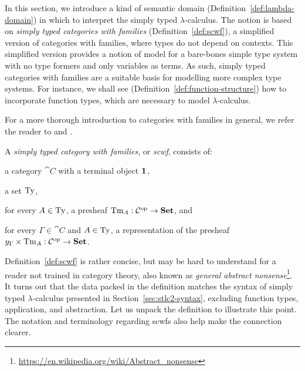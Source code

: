 In this section, we introduce a kind of semantic domain (Definition~\ref{def:lambda-domain}) in which to interpret the simply typed $\lambda$-calculus. The notion is based on \textit{simply typed categories with families} (Definition~\ref{def:scwf}), a simplified version of categories with families, where types do not depend on contexts. This simplified version provides a notion of model for a bare-bones simple type system with no type formers and only variables as terms. As such, simply typed categories with families are a suitable basis for modelling more complex type systems. For instance, we shall see (Definition~\ref{def:function-structure}) how to incorporate function types, which are necessary to model $\lambda$-calculus.

For a more thorough introduction to categories with families in general, we refer the reader to \cite{dybjer:1996:types} and \cite{castellan:2021:cwf}.

\begin{defn}[Scwf] \label{def:scwf}
A \emph{simply typed category with families}, or \emph{scwf}, consists of:
\begin{enum}
    \item a category $\cat{C}$ with a terminal object $\mathbf{1}_{}$,
    \item a set $\STy$,
    \item for every $A \in \STy$, a presheaf $\STm{A} : \op{\cat{C}} \to \Set$, and
    \item for every $\Gamma \in \cat{C}$ and $A \in \STy$, a representation of the presheaf $\cprod{\yap{\Gamma}}{\STm{A}} : \op{\cat{C}} \to \Set$.
\end{enum}
\end{defn}

Definition~\ref{def:scwf} is rather concise, but may be hard to understand for a reader not trained in category theory, also known as \textit{general abstract nonsense}\footnote{\url{https://en.wikipedia.org/wiki/Abstract_nonsense}}. It turns out that the data packed in the definition matches the syntax of simply typed $\lambda$-calculus presented in Section~\ref{sec:stlc2-syntax}, excluding function types, application, and abstraction. Let us unpack the definition to illustrate this point. The notation and terminology regarding scwfs also help make the connection clearer.

